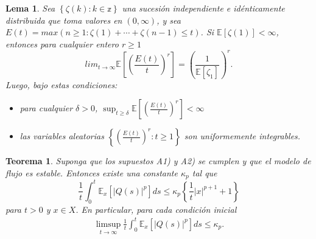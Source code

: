 \documentclass{article}
\newtheorem{Teo}{Teorema}
\newtheorem{Lemma}{Lema}
\newcommand{\esp}{\mathbb{E}}
\begin{document}
\begin{Lemma}\label{Lema.5.2}
 Sea $\left\{\zeta\left(k\right):k\in \mathbb{z}\right\}$ una sucesi\'on independiente e id\'enticamente distribuida que toma valores en $\left(0,\infty\right)$,
y sea
$E\left(t\right)=max\left(n\geq1:\zeta\left(1\right)+\cdots+\zeta\left(n-1\right)\leq
t\right)$. Si $\esp\left[\zeta\left(1\right)\right]<\infty$,
entonces para cualquier entero $r\geq1$
\begin{equation}
 lim_{t\rightarrow\infty}\esp\left[\left(\frac{E\left(t\right)}{t}\right)^{r}\right]=\left(\frac{1}{\esp\left[\zeta_{1}\right]}\right)^{r}.
\end{equation}
Luego, bajo estas condiciones:
\begin{itemize}
 \item[a)] para cualquier $\delta>0$, $\sup_{t\geq\delta}\esp\left[\left(\frac{E\left(t\right)}{t}\right)^{r}\right]<\infty$
\item[b)] las variables aleatorias
$\left\{\left(\frac{E\left(t\right)}{t}\right)^{r}:t\geq1\right\}$
son uniformemente integrables.
\end{itemize}
\end{Lemma}

\begin{Teo}\label{Tma.5.5}
Suponga que los supuestos A1) y A2) se cumplen y que el modelo de
flujo es estable. Entonces existe una constante $\kappa_{p}$ tal
que
\begin{equation}
\frac{1}{t}\int_{0}^{t}\esp_{x}\left[|Q\left(s\right)|^{p}\right]ds\leq\kappa_{p}\left\{\frac{1}{t}|x|^{p+1}+1\right\}
\end{equation}
para $t>0$ y $x\in X$. En particular, para cada condici\'on inicial
\begin{eqnarray*}
\limsup_{t\rightarrow\infty}\frac{1}{t}\int_{0}^{t}\esp_{x}\left[|Q\left(s\right)|^{p}\right]ds\leq\kappa_{p}.
\end{eqnarray*}
\end{Teo}
\end{document}
